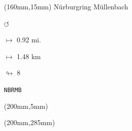 \begin{textblock*}{40mm}(160mm,15mm)%
Nürburgring Müllenbach
\par \Huge$\circlearrowleft$
\Large
\par$\mapsto$ 0.92 mi.
\par$\mapsto$ 1.48 km
\par$\looparrowright$ 8
\par\hfill\tiny\tt NBRMB\\
\end{textblock*}
\begin{textblock*}{20mm}(200mm,5mm)%
\fbox{\thepage}
\end{textblock*}
\begin{textblock*}{20mm}(200mm,285mm)%
\fbox{\thepage}
\end{textblock*}
\null\newpage

